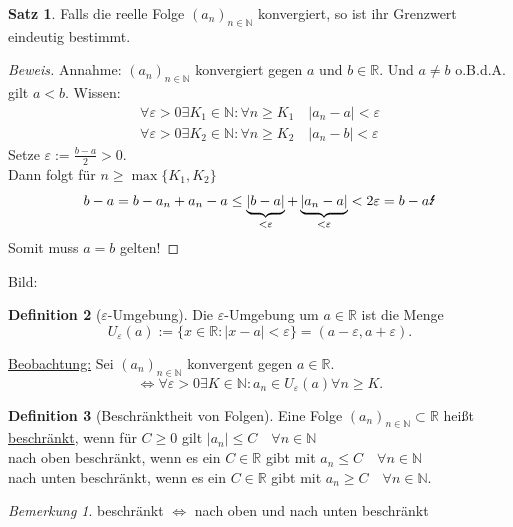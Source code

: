 \documentclass[12pt,a4paper,titlepage]{article} %
\theoremstyle{definition}
\newtheorem{satz}{Satz}[subsection]
\newtheorem{defi}[satz]{Definition}
\theoremstyle{remark}
\newtheorem*{bem}{Bemerkung}
\newenvironment{bew}{\begin{proof}[Beweis]}{\end{proof}}
\newcommand{\N}{\mathbb{N}}
\newcommand{\R}{\mathbb{R}}
\begin{document}
\begin{satz}
	Falls die reelle Folge $(a_n)_{n\in\N}$ konvergiert, so ist ihr Grenzwert eindeutig bestimmt.
\end{satz}
\begin{bew}
	Annahme: $(a_n)_{n\in\N}$ konvergiert gegen $a$ und $b\in\R$. Und $a\neq b$ o.B.d.A. gilt $a<b$.
	Wissen: 
	\begin{align*}
		\forall \varepsilon>0\exists K_1\in\N: \forall n\geq K_1 \quad |a_n -a| <\varepsilon\\
		\forall \varepsilon>0\exists K_2\in\N: \forall n\geq K_2 \quad |a_n -b| <\varepsilon
	\end{align*}
	Setze $\varepsilon:=\frac{b-a}{2} >0$.\\
	Dann folgt für $n\geq \max \{K_1,K_2\}$
	$$b-a = b-a_n + a_n -a \leq \underbrace{|b-a|}_{<\varepsilon} + \underbrace{|a_n-a|}_{<\varepsilon} < 2\varepsilon = b-a \text{\Lightning}$$
	Somit muss $a=b$ gelten!
\end{bew}
Bild:\\
\begin{center}
\end{center}
\begin{defi}[$\varepsilon$-Umgebung]
	Die $\varepsilon$-Umgebung um $a\in\R$ ist die Menge
	$$U_\varepsilon(a):= \{x\in\R: |x-a| <\varepsilon\} = (a-\varepsilon, a+\varepsilon).$$
\end{defi}
\underline{Beobachtung:} Sei $(a_n)_{n\in\N}$ konvergent gegen $a\in\R$.
$$\Leftrightarrow \forall\varepsilon >0 \exists K\in\N: a_n \in U_\varepsilon(a) \forall n\geq K.$$
\begin{defi}[Beschränktheit von Folgen]
	Eine Folge $(a_n)_{n\in\N} \subset \R$ heißt \underline{beschränkt}, wenn für $C\geq 0$ gilt $|a_n|\leq C \quad \forall n\in\N$\\
	nach oben beschränkt, wenn es ein $C\in\R$ gibt mit $a_n\leq C \quad \forall n\in\N$\\
	nach unten beschränkt, wenn es ein $C\in\R$ gibt mit $a_n\geq C \quad \forall n\in\N$.
\end{defi}
\begin{bem}
	beschränkt $\Leftrightarrow$ nach oben und nach unten beschränkt
\end{bem}
\end{document}
